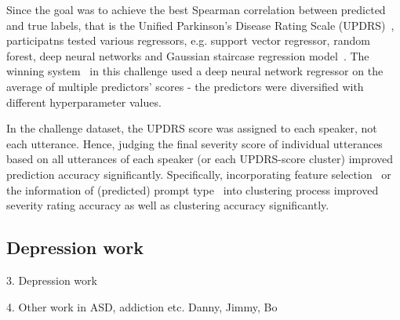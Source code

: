 \documentclass{article}
\begin{document}
Since the goal was to achieve the best Spearman correlation between predicted and true labels, that is the Unified Parkinson's Disease Rating Scale (UPDRS)~\cite{stebbins1998factor}, participatns tested various regressors, e.g. support vector regressor, random forest, deep neural networks and Gaussian staircase regression model~\cite{williamson2013vocal}. The winning system~\cite{grosz2015assessing} in this challenge used a deep neural network regressor on the average of multiple predictors' scores - the predictors were diversified with different hyperparameter values. 

In the challenge dataset, the UPDRS score was assigned to each speaker, not each utterance.
Hence, judging the final severity score of individual utterances based on all utterances of each speaker (or each UPDRS-score cluster) improved prediction accuracy significantly.
Specifically, incorporating feature selection~\cite{grosz2015assessing} or the information of (predicted) prompt type~\cite{kim2015automatic} into clustering process improved severity rating accuracy as well as clustering accuracy significantly.



\subsection{Depression work}

3. Depression work

4. Other work in ASD, addiction etc. 
Danny, Jimmy, Bo
\vfill\pagebreak



\end{document}
